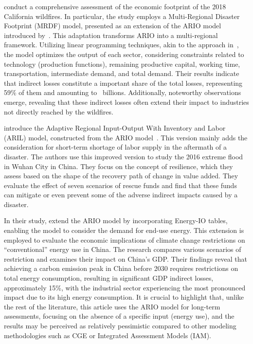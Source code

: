 \Textcite{wang-2020-econom-footp} conduct a comprehensive assessment
of the economic footprint of the 2018 California wildfires. In particular, the
study employs a Multi-Regional Disaster Footprint (MRDF) model, presented as an
extension of the ARIO model introduced
by~\textcite{hallegatte-2008-adapt-region}. This adaptation
transforms ARIO into a multi-regional framework. Utilizing linear programming
techniques, akin to the approach
in~\textcite{koks-2016-multir-impac}, the model optimizes
the
output of each sector, considering constraints related to technology (production
functions), remaining productive capital, working time, transportation,
intermediate demand, and total demand. Their results indicate that
indirect losses constitute a important share of the total losses, representing
59\% of them and amounting to~ billions. Additionally, noteworthy
observations emerge, revealing that these indirect losses often extend their
impact to industries not directly reached by the wildfires.

\Textcite{zhang-2021-analy-impac} introduce the Adaptive
Regional Input-Output With Inventory and Labor (ARIL) model, constructed from
the ARIO model~\parencite[version
from][]{hallegatte-2013-model-role}. This version mainly adds the
consideration for short-term shortage of labor supply in the aftermath of a
disaster. The authors use this improved version to study the 2016 extreme flood
in Wuhan City in China. They focus on the concept of resilience, which they
assess based on the shape of the recovery path of change in value added. They
evaluate the effect of seven scenarios of rescue funds and find that these funds
can mitigate or even prevent some of the adverse indirect impacts caused by a
disaster.

In their study, \textcite{huang-2022-estim-poten} extend the ARIO model by
incorporating Energy-IO tables, enabling the model to consider the demand for
end-use energy. This extension is employed to evaluate the economic implications
of climate change restrictions on ``conventional'' energy use in China. The
research compares various scenarios of restriction and examines their impact on
China's GDP. Their findings reveal that achieving a carbon emission peak in
China before 2030 requires restrictions on total energy consumption, resulting
in significant GDP indirect losses, approximately 15\%,
with the industrial sector experiencing the most pronounced impact due to its
high energy consumption. It is crucial to highlight that, unlike the rest of the
literature, this article uses the ARIO model for long-term assessments,
focusing on the absence of a specific input (energy use), and the results may be
perceived as relatively pessimistic compared to other modeling methodologies
such as CGE or Integrated Assessment Models (IAM).

